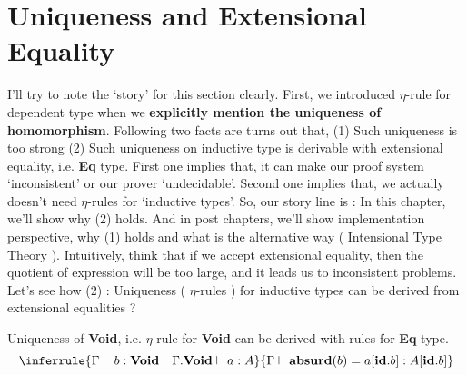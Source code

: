 \documentclass[12pt, a4paper, openany, twoside]{book}
\theoremstyle{definition}
\theoremstyle{remark}
\theoremstyle{plain}
\numberwithin{equation}{section}
\begin{document}
\section{Uniqueness and Extensional Equality}

I'll try to note the \lq story' for this section clearly. First, we introduced $\eta$-rule for dependent type when we \textbf{explicitly mention the uniqueness of homomorphism}. 
Following two facts are turns out that, (1) Such uniqueness is too strong (2) Such uniqueness on inductive type is derivable with extensional equality, i.e. \textbf{Eq} type. 
First one implies that, it can make our proof system \lq inconsistent' or our prover \lq undecidable'. Second one implies that, 
we actually doesn't need $\eta$-rules for \lq inductive types'. So, our story line is : In this chapter, we'll show why (2) holds. And in post chapters, 
we'll show implementation perspective, why (1) holds and what is the alternative way ( Intensional Type Theory ). 
Intuitively, think that if we accept extensional equality, then the quotient of expression will be too large, and it leads us to inconsistent problems. 
Let's see how (2) : Uniqueness ( $\eta$-rules ) for inductive types can be derived from extensional equalities ?

\begin{tcolorbox}[breakable, colback=yellow!10!white,colframe=red!75!black,title=Theorem 4.1.1.]\hypertarget{thm 4.1.1.}{}
Uniqueness of \textbf{Void}, i.e. $\eta$-rule for \textbf{Void} can be derived with rules for \textbf{Eq} type. 
\[
\inferrule
{
    \Gamma \vdash b : \textbf{Void} \quad \Gamma.\mathbf{Void} \vdash a : A 
}
{
    \Gamma \vdash \mathbf{absurd}(b) = a[\mathbf{id}.b] : A[\mathbf{id}.b]
}
\]
\end{tcolorbox}
\end{document}
